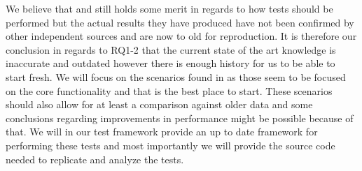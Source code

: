 We believe that \cite{Sanjay2011} and \cite{Perera07,Perera07R2,Perera07R3,mulesoft08} still holds some merit in regards to how tests should be performed but the actual results they have produced have not been confirmed by other independent sources and are now to old for reproduction. 
It is therefore our conclusion in regards to RQ1-2 that the current state of the art knowledge is inaccurate and outdated however there is enough history for us to be able to start fresh.
We will focus on the scenarios found in \cite{Perera07,Perera07R2,Perera07R3,mulesoft08,Sanjay2011} as those seem to be focused on the core functionality and that is the best place to start.
These scenarios should also allow for at least a comparison against older data and some conclusions regarding improvements in performance might be possible because of that.
We will in our test framework provide an up to date framework for performing these tests and most importantly we will provide the source code needed to replicate and analyze the tests.
